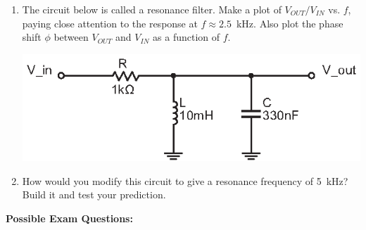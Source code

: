 \begin{enumerate}[wide]
\item The circuit below is called a resonance filter.  Make a plot of $V_{OUT}/V_{IN}$ vs. $f$, paying close attention to the response at $f \approx 2.5$~kHz.  Also plot the phase shift $\phi$ between $V_{OUT}$ and $V_{IN}$ as a function of $f$. 
\begin{center}
\includegraphics{filters/LC_resonance_filter.eps}
\end{center}

\item How would you modify this circuit to give a resonance frequency of 5~kHz?   Build it and test your prediction.


\end{enumerate}

\pagebreak[3]
\textbf{Possible Exam Questions:}


